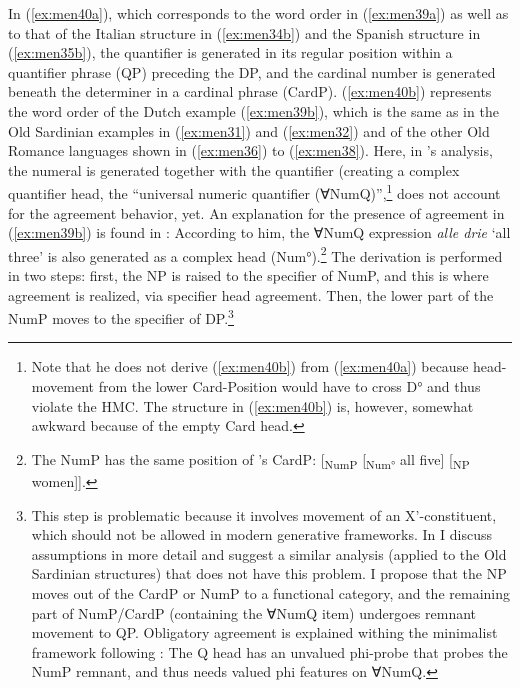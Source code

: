 \documentclass[output=paper,colorlinks,citecolor=brown]{langscibook}
\begin{document}
In (\ref{ex:men40a}), which corresponds to the word order in (\ref{ex:men39a}) as well as to that of the Italian structure in (\ref{ex:men34b}) and  the Spanish structure in (\ref{ex:men35b}), the quantifier is generated in its regular position within a quantifier phrase (QP) preceding the DP, and the cardinal number is generated beneath the determiner in a cardinal phrase (CardP). (\ref{ex:men40b}) represents the word order of the Dutch example (\ref{ex:men39b}), which is the same as in the Old Sardinian examples in (\ref{ex:men31}) and (\ref{ex:men32}) and of the other Old Romance languages shown in (\ref{ex:men36}) to (\ref{ex:men38}). Here, in \citeauthor{Cirillo2009}'s  analysis, the numeral is generated together with the quantifier (creating a complex quantifier head, the “universal numeric quantifier (∀NumQ)”,\footnote{Note that he does not derive (\ref{ex:men40b}) from (\ref{ex:men40a}) because head-movement from the lower Card-Position would have to cross D° and thus violate the HMC. The structure in (\ref{ex:men40b}) is, however, somewhat awkward because of the empty Card head.} \citeauthor{Cirillo2009} does not account for the agreement behavior, yet. An explanation for the presence of agreement in (\ref{ex:men39b}) is found in \citet{Corver2010}: According to him, the ∀NumQ expression \textit{alle drie} ‘all three’ is also generated as a complex head (Num°).\footnote{The NumP has the same position of \citeauthor{Cirillo2009}’s CardP: [\textsubscript{NumP} [\textsubscript{Num°} all five] [\textsubscript{NP} women]].} The derivation is performed in two steps: first, the NP is raised to the specifier of NumP, and this is where agreement is realized, via specifier head agreement. Then, the lower part of the NumP moves to the specifier of DP.\footnote{This step is problematic because it involves movement of an X'-constituent, which should not be allowed in modern generative frameworks. In \citet{Mensching2023} I discuss  assumptions in more detail and suggest a similar analysis (applied to the Old Sardinian structures) that does not have this problem. I propose that the NP moves out of the CardP or NumP to a functional category, and the remaining part of NumP/CardP (containing the ∀NumQ item) undergoes remnant movement to QP. Obligatory agreement is explained withing the minimalist framework following \citet{Chomsky2000}: The Q head has an unvalued phi-probe that probes the NumP remnant, and thus needs valued phi features on ∀NumQ.}
\end{document}

